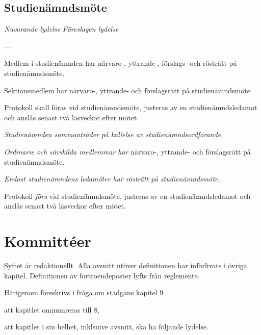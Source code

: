 \documentclass{article}
\newenvironment{lydelse}
    {\begin{paracol}{2}%
        \emph{Nuvarande lydelse}%
        \switchcolumn%
        \emph{Föreslagen lydelse}%
    \end{paracol}%
    \begin{enumerate}[label=\thesubsection.\arabic*]%
    \begin{paracol}{2}%
    }{\end{paracol}\end{enumerate}}
\begin{document}
\subsection{Studienämndsmöte}
\begin{lydelse}
  \setcounter{section}{8}
  \setcounter{subsection}{4}
  \item[] ---
  \item Medlem i studienämnden har närvaro-, yttrande-, förslags- och rösträtt på studienämndsmöte.
  \item Sektionsmedlem har närvaro-, yttrande- och förslagsrätt på studienämndsmöte.
  \setcounter{subsection}{3}
  \setcounter{enumi}{0}   
  \item Protokoll skall föras vid studienämndsmöte, justeras av en studienämndsledamot och anslås senast två läsveckor efter mötet.
  \switchcolumn
  \setcounter{section}{7}
  \setcounter{subsection}{2}
  \item \emph{Studienämnden sammanträder på kallelse av studienämndsordförande.}
  \item \emph{Ordinarie och särskilda medlemmar har} närvaro-, yttrande- och förslagsrätt på studienämndsmöte. \label{7.x:SNFrätt}
  \item \emph{Endast studienämndens ledamöter har rösträtt på studienämndsmöte.}
  \item Protokoll \emph{förs} vid studienämndsmöte, justeras av en studienämndsledamot och anslås senast två läsveckor efter mötet.
  \label{S:StudienamndProtokoll}
\end{lydelse}
\setcounter{section}{7}
\setcounter{subsection}{2}

\section{Kommittéer}
Syftet är redaktionellt.
Alla avsnitt utöver definitionen har införlivats i övriga kapitel.
Definitionen av förtroendeposter lyfts från reglemente.

Härigenom föreskrivs i fråga om stadgans kapitel 9
\begin{dels}
\item att kapitlet omnumreras till 8,
\item att kapitlet i sin helhet, inklsuive avsnitt, ska ha följande lydelse.
\end{dels}
\end{document}
